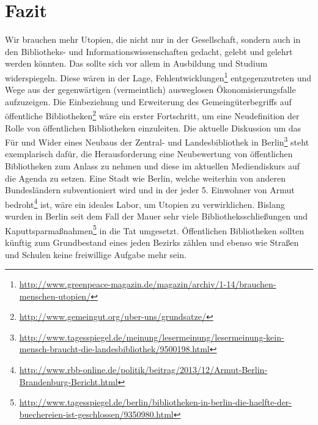 \documentclass[a4paper,
fontsize=11pt,
oneside,
numbers=noperiodatend,
parskip=half-,
bibliography=totoc,
final
]{scrartcl}
\begin{document}
\section{Fazit}\label{fazit}

Wir brauchen mehr Utopien, die nicht nur in der Gesellschaft, sondern
auch in den Bibliotheks- und Informationswissenschaften gedacht, gelebt
und gelehrt werden könnten. Das sollte sich vor allem in Ausbildung und
Studium widerspiegeln. Diese wären in der Lage,
Fehlentwicklungen\footnote{\url{http://www.greenpeace-magazin.de/magazin/archiv/1-14/brauchen-menschen-utopien/}}
entgegenzutreten und Wege aus der gegenwärtigen (vermeintlich)
ausweglosen Ökonom\-isierungsfalle aufzuzeigen. Die Einbeziehung und
Erweiterung des Gemeingüterbegriffs auf öffentliche
Bibliotheken\footnote{\url{http://www.gemeingut.org/uber-uns/grundsatze/}}
wäre ein erster Fortschritt, um eine Neudefinition der Rolle von
öffent\-lichen Bibliotheken einzuleiten. Die aktuelle Diskussion um das
Für und Wider eines Neubaus der Zentral- und Landesbibliothek in
Berlin\footnote{\url{http://www.tagesspiegel.de/meinung/lesermeinung/lesermeinung-kein-mensch-braucht-die-landesbibliothek/9500198.html}}
steht exemplarisch dafür, die Herausforderung eine Neubewertung von
öffentlichen Bibliotheken zum Anlass zu nehmen und diese im aktuellen
Mediendiskurs auf die Agenda zu setzen. Eine Stadt wie Berlin, welche
weiterhin von anderen Bundesländern subventioniert wird und in der jeder
5. Einwohner von Armut bedroht\footnote{\url{http://www.rbb-online.de/politik/beitrag/2013/12/Armut-Berlin-Brandenburg-Bericht.html}}
ist, wäre ein ideales Labor, um Utopien zu verwirklichen. Bislang wurden
in Berlin seit dem Fall der Mauer sehr viele Bibliotheksschließungen und
Kaputtsparmaßnahmen\footnote{\url{http://www.tagesspiegel.de/berlin/bibliotheken-in-berlin-die-haelfte-der-buechereien-ist-geschlossen/9350980.html}}
in die Tat umgesetzt. Öffentlichen Bibliotheken sollten künftig zum
Grundbestand eines jeden Bezirks zählen und ebenso wie Straßen und
Schulen keine freiwillige Aufgabe mehr sein.
\end{document}
